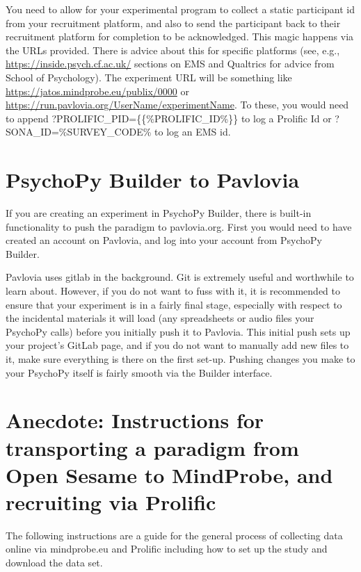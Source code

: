 \documentclass[
  12pt,
]{book}
\begin{document}
You need to allow for your experimental program to collect a static participant id from your recruitment platform, and also to send the participant back to their recruitment platform for completion to be acknowledged. This magic happens via the URLs provided. There is advice about this for specific platforms (see, e.g., \url{https://inside.psych.cf.ac.uk/} sections on EMS and Qualtrics for advice from School of Psychology). The experiment URL will be something like \url{https://jatos.mindprobe.eu/publix/0000} or \url{https://run.pavlovia.org/UserName/experimentName}. To these, you would need to append ?PROLIFIC\_PID=\{\{\%PROLIFIC\_ID\%\}\} to log a Prolific Id or ?SONA\_ID=\%SURVEY\_CODE\% to log an EMS id.

\section{PsychoPy Builder to Pavlovia}\label{psychopy-builder-to-pavlovia}

If you are creating an experiment in PsychoPy Builder, there is built-in functionality to push the paradigm to pavlovia.org. First you would need to have created an account on Pavlovia, and log into your account from PsychoPy Builder.

Pavlovia uses gitlab in the background. Git is extremely useful and worthwhile to learn about. However, if you do not want to fuss with it, it is recommended to ensure that your experiment is in a fairly final stage, especially with respect to the incidental materials it will load (any spreadsheets or audio files your PsychoPy calls) before you initially push it to Pavlovia. This initial push sets up your project's GitLab page, and if you do not want to manually add new files to it, make sure everything is there on the first set-up. Pushing changes you make to your PsychoPy itself is fairly smooth via the Builder interface.

\section{Anecdote: Instructions for transporting a paradigm from Open Sesame to MindProbe, and recruiting via Prolific}\label{anecdote-instructions-for-transporting-a-paradigm-from-open-sesame-to-mindprobe-and-recruiting-via-prolific}

The following instructions are a guide for the general process of collecting data online via mindprobe.eu and Prolific including how to set up the study and download the data set.
\end{document}
